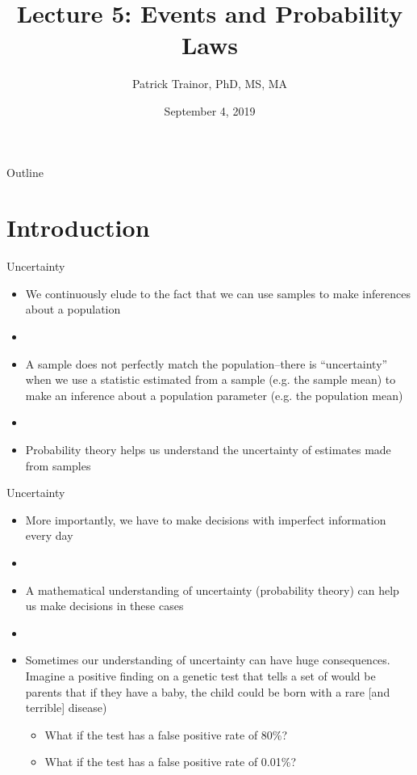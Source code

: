 \documentclass[xcolor=dvipsnames]{beamer}
\title[Lecture 4]{Lecture 5: Events and Probability Laws}
\author[Patrick Trainor]{Patrick Trainor, PhD, MS, MA}
\institute[NMSU]{New Mexico State University}
\date{September 4, 2019}
\begin{document}
\begin{frame}
\maketitle
\end{frame}

\begin{frame}{Outline}
\tableofcontents[hideallsubsections]
\end{frame}

\section{Introduction}
\begin{frame}{Uncertainty}
	\begin{itemize}
		\item We continuously elude to the fact that we can use samples to make inferences about a population
		\item[]
		\item A sample does not perfectly match the population--there is ``uncertainty'' when we use a statistic estimated from a sample (e.g. the sample mean) to make an inference about a population parameter (e.g. the population mean)
		\item[]
		\item Probability theory helps us understand the uncertainty of estimates made from samples
	\end{itemize}
\end{frame}

\begin{frame}{Uncertainty}
\begin{itemize}
	\item More importantly, we have to make decisions with imperfect information every day
	\item[]
	\item A mathematical understanding of uncertainty (probability theory) can help us make decisions in these cases
	\item[]
	\item Sometimes our understanding of uncertainty can have huge consequences. Imagine a positive finding on a genetic test that tells a set of would be parents that if they have a baby, the child could be born with a rare [and terrible] disease)
	\begin{itemize}
		\item What if the test has a false positive rate of 80\%?
		\item What if the test has a false positive rate of 0.01\%?
	\end{itemize}
\end{itemize}
\end{frame}
\end{document}
